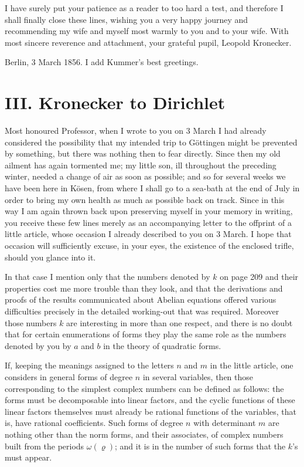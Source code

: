 \documentclass[11pt]{article}
\begin{document}
I have surely put your patience as a reader to too hard a test, and therefore I shall finally close these lines, wishing you a very happy journey and recommending my wife and myself most warmly to you and to your wife. With most sincere reverence and attachment, your grateful pupil, Leopold Kronecker.

Berlin, 3 March 1856. I add Kummer's best greetings.

\section*{III. Kronecker to Dirichlet}
Most honoured Professor, when I wrote to you on 3 March I had already considered the possibility that my intended trip to Göttingen might be prevented by something, but there was nothing then to fear directly. Since then my old ailment has again tormented me; my little son, ill throughout the preceding winter, needed a change of air as soon as possible; and so for several weeks we have been here in Kösen, from where I shall go to a sea-bath at the end of July in order to bring my own health as much as possible back on track. Since in this way I am again thrown back upon preserving myself in your memory in writing, you receive these few lines merely as an accompanying letter to the offprint of a little article, whose occasion I already described to you on 3 March. I hope that occasion will sufficiently excuse, in your eyes, the existence of the enclosed trifle, should you glance into it.

In that case I mention only that the numbers denoted by $k$ on page 209 and their properties cost me more trouble than they look, and that the derivations and proofs of the results communicated about Abelian equations offered various difficulties precisely in the detailed working-out that was required. Moreover those numbers $k$ are interesting in more than one respect, and there is no doubt that for certain enumerations of forms they play the same role as the numbers denoted by you by $a$ and $b$ in the theory of quadratic forms.

If, keeping the meanings assigned to the letters $n$ and $m$ in the little article, one considers in general forms of degree $n$ in several variables, then those corresponding to the simplest complex numbers can be defined as follows: the forms must be decomposable into linear factors, and the cyclic functions of these linear factors themselves must already be rational functions of the variables, that is, have rational coefficients. Such forms of degree $n$ with determinant $m$ are nothing other than the norm forms, and their associates, of complex numbers built from the periods $\omega(\varrho)$; and it is in the number of such forms that the $k$'s must appear.
\end{document}

